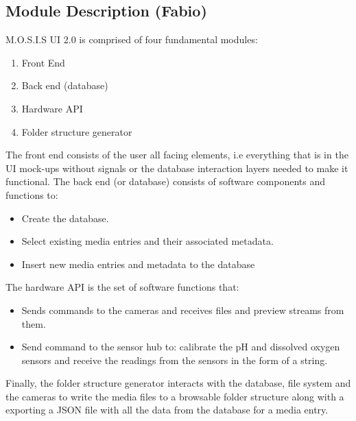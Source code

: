\subsection{Module Description (Fabio)}
M.O.S.I.S UI 2.0 is comprised of four fundamental modules:
\begin{enumerate}
	\item Front End
	\item Back end (database)
	\item Hardware API
	\item Folder structure generator
\end{enumerate}
The front end consists of the user all facing elements, i.e everything that is in the UI mock-ups without signals or the database interaction layers needed to make it functional. The back end (or database) consists of software components and functions to:
\begin{itemize}
	\item Create the database.
	\item Select existing media entries and their associated metadata.
	\item Insert new media entries and metadata to the database
\end{itemize}
The hardware API is the set of software functions that:
\begin{itemize}
	\item Sends commands to the cameras and receives files and preview streams from them.
	\item Send command to the sensor hub to: calibrate the pH and dissolved oxygen sensors and receive the readings from the sensors in the form of a string.
\end{itemize}
Finally, the folder structure generator interacts with the database, file system and the cameras to write the media files to a browsable folder structure along with a exporting a JSON file with all the data from the database for a media entry.